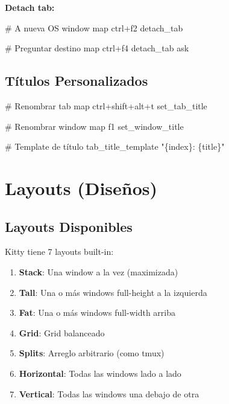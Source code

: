 \documentclass[
  doc,
  floatsintext,
  longtable,
  a4paper,
  nolmodern,
  notxfonts,
  notimes,
  12pt,
  colorlinks=true,linkcolor=blue,citecolor=blue,urlcolor=blue]{apa7}
\newenvironment{Shaded}{\begin{snugshade}}{\end{snugshade}}
\newcommand{\CommentTok}[1]{\textcolor[rgb]{0.37,0.37,0.37}{#1}}
\newcommand{\DataTypeTok}[1]{\textcolor[rgb]{0.68,0.00,0.00}{#1}}
\newcommand{\ErrorTok}[1]{\textcolor[rgb]{0.68,0.00,0.00}{#1}}
\providecommand{\tightlist}{%
  \setlength{\itemsep}{0pt}\setlength{\parskip}{0pt}}
\begin{document}
\textbf{Detach tab:}

\begin{Shaded}
\begin{Highlighting}[]
\CommentTok{\# A nueva OS window}
\DataTypeTok{map} \DataTypeTok{ctrl}\ErrorTok{+}\DataTypeTok{f2} \DataTypeTok{detach\_tab}

\CommentTok{\# Preguntar destino}
\DataTypeTok{map} \DataTypeTok{ctrl}\ErrorTok{+}\DataTypeTok{f4} \DataTypeTok{detach\_tab} \DataTypeTok{ask}
\end{Highlighting}
\end{Shaded}

\subsection{Títulos Personalizados}\label{tuxedtulos-personalizados}

\begin{Shaded}
\begin{Highlighting}[]
\CommentTok{\# Renombrar tab}
\DataTypeTok{map} \DataTypeTok{ctrl}\ErrorTok{+}\DataTypeTok{shift}\ErrorTok{+}\DataTypeTok{alt}\ErrorTok{+}\DataTypeTok{t} \DataTypeTok{set\_tab\_title}

\CommentTok{\# Renombrar window}
\DataTypeTok{map} \DataTypeTok{f1} \DataTypeTok{set\_window\_title}

\CommentTok{\# Template de título}
\DataTypeTok{tab\_title\_template} \DataTypeTok{"\{index\}: \{title\}"}
\end{Highlighting}
\end{Shaded}

\section{Layouts (Diseños)}\label{layouts-diseuxf1os}

\subsection{Layouts Disponibles}\label{layouts-disponibles}

Kitty tiene 7 layouts built-in:

\begin{enumerate}
\def\labelenumi{\arabic{enumi}.}
\tightlist
\item
  \textbf{Stack}: Una window a la vez (maximizada)
\item
  \textbf{Tall}: Una o más windows full-height a la izquierda
\item
  \textbf{Fat}: Una o más windows full-width arriba
\item
  \textbf{Grid}: Grid balanceado
\item
  \textbf{Splits}: Arreglo arbitrario (como tmux)
\item
  \textbf{Horizontal}: Todas las windows lado a lado
\item
  \textbf{Vertical}: Todas las windows una debajo de otra
\end{enumerate}
\end{document}
